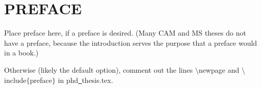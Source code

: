 \chapter*{PREFACE}

Place preface here, if a preface is desired.
(Many CAM and MS theses do not have a preface, because the
introduction serves the purpose that a preface would
in a book.)


Otherwise (likely the default option), comment out 
the lines 
$\setminus $newpage 
and 
$\setminus $include$\{ $preface$\} $
in phd\underline{~}thesis.tex.




